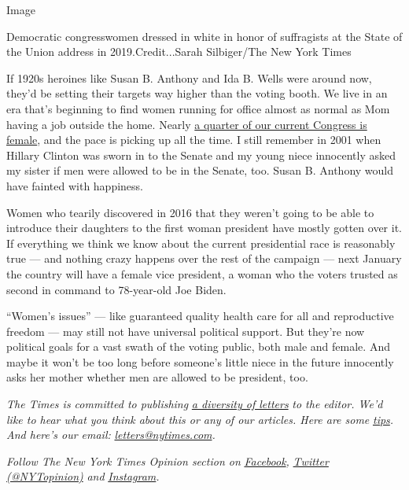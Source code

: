 Image

Democratic congresswomen dressed in white in honor of suffragists at the
State of the Union address in 2019.Credit...Sarah Silbiger/The New York
Times

If 1920s heroines like Susan B. Anthony and Ida B. Wells were around
now, they'd be setting their targets way higher than the voting booth.
We live in an era that's beginning to find women running for office
almost as normal as Mom having a job outside the home. Nearly
\href{https://cawp.rutgers.edu/current-numbers}{a quarter of our current
Congress is female}, and the pace is picking up all the time. I still
remember in 2001 when Hillary Clinton was sworn in to the Senate and my
young niece innocently asked my sister if men were allowed to be in the
Senate, too. Susan B. Anthony would have fainted with happiness.

Women who tearily discovered in 2016 that they weren't going to be able
to introduce their daughters to the first woman president have mostly
gotten over it. If everything we think we know about the current
presidential race is reasonably true --- and nothing crazy happens over
the rest of the campaign --- next January the country will have a female
vice president, a woman who the voters trusted as second in command to
78-year-old Joe Biden.

``Women's issues'' --- like guaranteed quality health care for all and
reproductive freedom --- may still not have universal political support.
But they're now political goals for a vast swath of the voting public,
both male and female. And maybe it won't be too long before someone's
little niece in the future innocently asks her mother whether men are
allowed to be president, too.

\emph{The Times is committed to publishing}
\href{https://www.nytimes.com/2019/01/31/opinion/letters/letters-to-editor-new-york-times-women.html}{\emph{a
diversity of letters}} \emph{to the editor. We'd like to hear what you
think about this or any of our articles. Here are some}
\href{https://help.nytimes.com/hc/en-us/articles/115014925288-How-to-submit-a-letter-to-the-editor}{\emph{tips}}\emph{.
And here's our email:}
\href{mailto:letters@nytimes.com}{\emph{letters@nytimes.com}}\emph{.}

\emph{Follow The New York Times Opinion section on}
\href{https://www.facebook.com/nytopinion}{\emph{Facebook}}\emph{,}
\href{http://twitter.com/NYTOpinion}{\emph{Twitter (@NYTopinion)}}
\emph{and}
\href{https://www.instagram.com/nytopinion/}{\emph{Instagram}}\emph{.}

